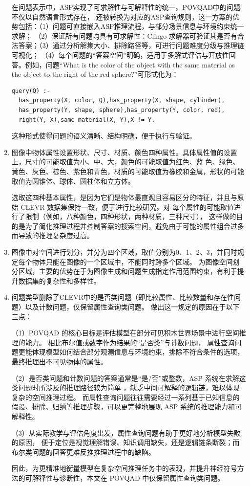 \begin{enumerate}[nosep]
在问题表示中，ASP实现了可求解性与可解释性的统一。POVQAD中的问题不仅以自然语言形式存在，
还被转换为对应的ASP查询规则，这一方案的优势包括：（1）问题可直接嵌入ASP推理流程，与部分场景信息与环境约束统一求解；
（2）保证所有问题均具有可求解性：Clingo 求解器可验证其是否有合法答案；（3）通过分析解集大小、排除路径等，可进行问题难度分级与推理链可视化；
（4）每个问题的“答案空间”明确，适用于多解式评估与开放性回答。例如，问题“What is the color of the object with the same material as the object to the right of the red sphere?”可形式化为：
\begin{lstlisting}
query(Q) :-
  has_property(X, color, Q),has_property(X, shape, cylinder),
  has_property(Y, shape, sphere),has_property(Y, color, red),
  right(Y, X),same_material(X, Y),X != Y.
\end{lstlisting}
这种形式使得问题的语义清晰、结构明确，便于执行与验证。
\item 图像中物体属性设置形状、尺寸、材质、颜色四种属性。具体属性值的设置上，尺寸的可能取值为小、中、大，颜色的可能取值为红色、蓝
色、绿色、黄色、灰色、棕色、紫色和青色，材质的可能取值为橡胶和金属，形状的可能取值为圆锥体、球体、圆柱体和立方体。

选取这四种基本属性，是因为它们是物体最直观且容易区分的特征，并且与原始 CLEVR 数据集保持一致，便于进行比较研究。对
每个属性的可能取值进行了限制（例如，八种颜色，四种形状，两种材质，三种尺寸），
这样做的目的是为了简化推理过程并控制答案的搜索空间，避免由于可能的属性组合过多而导致的推理复杂度过高。
\item 图像中对空间进行划分，并分为四个区域，取值分别为0、1、2、3，并同时规定每个物体只能在图像的一个区域中，不能同时跨多个区域。
为图像空间划分区域，主要的优势在于为图像生成和问题生成指定作用范围约束，有利于提升数据集的复杂性和多样性。
\item 问题类型删除了CLEVR中的是否类问题（即比较属性、比较数量和存在性问题）以及计数问题，仅保留属性查询类问题。
做出这一规定的原因在于以下三点：

（1）POVQAD 的核心目标是评估模型在部分可见积木世界场景中进行空间推理的能力。
相比布尔值或数字作为结果的“是否类”与计数问题，
属性查询问题更能体现模型如何结合部分观测信息与环境约束，排除不符合条件的选项，最终推理出不可见物体的属性。

（2）是否类问题和计数问题的答案通常是“是/否”或整数，ASP 系统在求解这类问题时所涉及的推理路径较为简单
，缺乏中间可解释的逻辑链，难以体现复杂的空间推理过程。
而属性查询问题往往需要经过一系列基于已知信息的假设、排除、归纳等推理步骤，可以更完整地展现 ASP 系统的推理能力和可解释性。

（3）从实际教学与评估角度出发，属性查询问题有助于更好地分析模型失败的原因，
便于定位是视觉理解错误、知识调用缺失，还是逻辑链条断裂；而布尔类问题的回答更难反推推理过程中的缺陷。

因此，为更精准地衡量模型在复杂空间推理任务中的表现，并提升神经符号方法的可解释性与诊断性，本文在 POVQAD 中仅保留属性查询类问题。
\end{enumerate}
